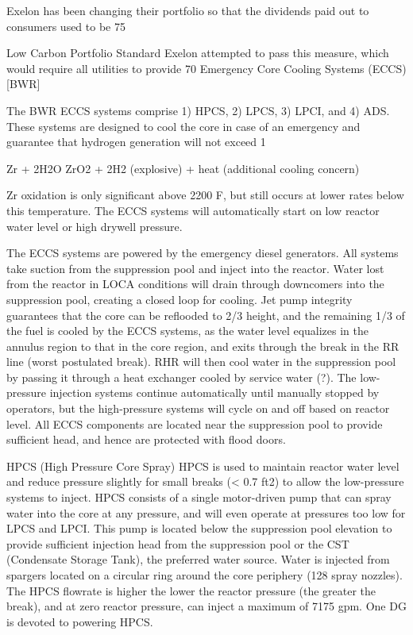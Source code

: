 \documentclass[10pt]{article}
\begin{document}
Exelon has been changing their portfolio so that the dividends paid out to consumers used to be 75%

Low Carbon Portfolio Standard
Exelon attempted to pass this measure, which would require all utilities to provide 70%
Emergency Core Cooling Systems (ECCS) [BWR]

The BWR ECCS systems comprise 1) HPCS, 2) LPCS, 3) LPCI, and 4) ADS. These systems are designed to cool the core in case of an emergency and guarantee that hydrogen generation will not exceed 1%

Zr + 2H2O  ZrO2 + 2H2 (explosive) + heat (additional cooling concern)

Zr oxidation is only significant above 2200 F, but still occurs at lower rates below this temperature. The ECCS systems will automatically start on low reactor water level or high drywell pressure. 

The ECCS systems are powered by the emergency diesel generators. All systems take suction from the suppression pool and inject into the reactor. Water lost from the reactor in LOCA conditions will drain through downcomers into the suppression pool, creating a closed loop for cooling. Jet pump integrity guarantees that the core can be reflooded to 2/3 height, and the remaining 1/3 of the fuel is cooled by the ECCS systems, as the water level equalizes in the annulus region to that in the core region, and exits through the break in the RR line (worst postulated break). RHR will then cool water in the suppression pool by passing it through a heat exchanger cooled by service water (?). The low-pressure injection systems continue automatically until manually stopped by operators, but the high-pressure systems will cycle on and off based on reactor level. All ECCS components are located near the suppression pool to provide sufficient head, and hence are protected with flood doors. 

HPCS (High Pressure Core Spray)
HPCS is used to maintain reactor water level and reduce pressure slightly for small breaks (< 0.7 ft2) to allow the low-pressure systems to inject. HPCS consists of a single motor-driven pump that can spray water into the core at any pressure, and will even operate at pressures too low for LPCS and LPCI. This pump is located below the suppression pool elevation to provide sufficient injection head from the suppression pool  or the CST (Condensate Storage Tank), the preferred water source. Water is injected from spargers located on a circular ring around the core periphery (128 spray nozzles). The HPCS flowrate is higher the lower the reactor pressure (the greater the break), and at zero reactor pressure, can inject a maximum of 7175 gpm. One DG is devoted to powering HPCS. 
\end{document}
